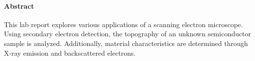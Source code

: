 \paragraph{Abstract}
This lab report explores various applications of a scanning electron
microscope.
Using secondary electron detection, the topography of an unknown
semiconductor sample is analyzed.
Additionally, material characteristics are determined through
X-ray emission and backscattered electrons.
